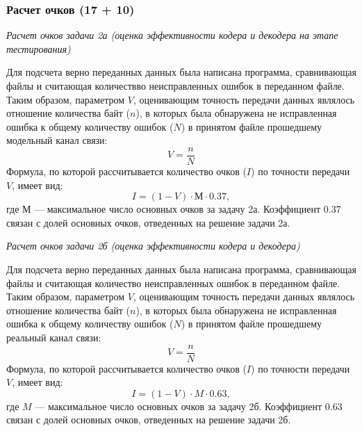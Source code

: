 \subsubsection*{Расчет очков (17 + 10)}

\textit{Расчет очков задачи 2а (оценка эффективности кодера и декодера на этапе тестирования)}

Для подсчета верно переданных данных была написана программа, сравнивающая файлы и считающая количествво неисправленных ошибок в переданном файле. Таким образом, параметром $V$, оценивающим точность передачи данных являлось отношение количества байт ($n$), в которых была обнаружена не исправленная ошибка к общему количеству ошибок ($N$) в принятом файле прошедшему модельный канал связи:
$$V =\frac{n}{N}$$
Формула, по которой рассчитывается количество очков ($I$) по точности передачи $V$, имеет вид:
$$I = (1-V) \cdot М \cdot 0.37,$$
где $М$ — максимальное число основных очков за задачу 2а. Коэффициент 0.37 связан с долей основных очков, отведенных на решение задачи 2а.

\textit{Расчет очков задачи 2б (оценка эффективности кодера и декодера)}

Для подсчета верно переданных данных была написана программа, сравнивающая файлы и считающая количество неисправленных ошибок в переданном файле. Таким образом, параметром $V$, оценивающим точность передачи данных являлось отношение количества байт ($n$), в которых была обнаружена не исправленная ошибка к общему количеству ошибок ($N$) в принятом файле прошедшему реальный канал связи:
$$V = \frac{n}{N}$$
Формула, по которой рассчитывается количество очков ($I$) по точности передачи $V$, имеет вид:
$$I = (1-V) \cdot M \cdot 0.63,$$
где $M$ — максимальное число основных очков за задачу 2б. Коэффициент 0.63 связан с долей основных очков, отведенных на решение задачи 2б.